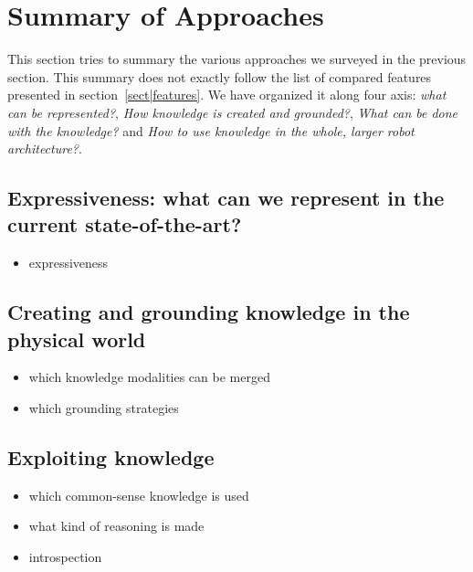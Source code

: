 \documentclass[a4paper, twocolumn]{article}
\begin{document}
\section{Summary of Approaches}
\label{sect|summary}

This section tries to summary the various approaches we surveyed in the
previous section.  This summary does not exactly follow the list of compared
features presented in section~\ref{sect|features}. We have organized
it along four axis: \emph{what can be represented?}, \emph{How knowledge is
created and grounded?}, \emph{What can be done with the knowledge?} and
\emph{How to use knowledge in the whole, larger robot architecture?}.

\subsection{Expressiveness: what can we represent in the current state-of-the-art?}
\label{sect|summary-expressiveness}

\begin{itemize}
	\item expressiveness
\end{itemize}


\subsection{Creating and grounding knowledge in the physical world}
\label{sect|summary-grounding}


\begin{itemize}
	\item which knowledge modalities can be merged
	\item which grounding strategies
\end{itemize}


\subsection{Exploiting knowledge}
\label{sect|summary-knowledge-sources-reasoning}

\begin{itemize}
	\item which common-sense knowledge is used
	\item what kind of reasoning is made
	\item introspection
\end{itemize}
\end{document}
